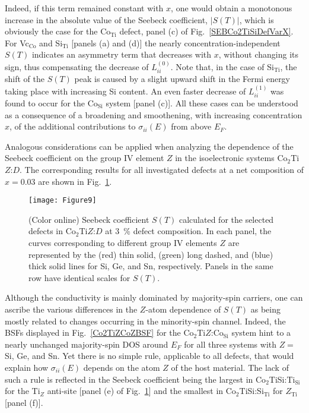 \documentclass[aps,prb,twocolumn,superscriptaddress,showpacs]{revtex4}
\newcommand{\FG}[1]{Fig.~\ref{#1}}
\begin{document}
Indeed, if this term remained constant with  $x$, one would obtain 
a monotonous increase in the absolute value of the Seebeck coefficient,
$|S(T)|$, which is obviously the case for the Co$_\text{Ti}$ defect, 
panel (c) of \FG{SEBCo2TiSiDefVarX}.
For Vc$_\text{Co}$ and Si$_\text{Ti}$ [panels (a) and (d)]
the nearly concentration-independent $S(T)$ indicates an 
asymmetry term that decreases with $x$, without changing
its sign, thus compensating the decrease of $L_{ii}^{(0)}$. 
Note that, in the case of Si$_\text{Ti}$, the shift of the 
$S(T)$ peak is caused by a slight upward shift in the Fermi 
energy taking place with increasing Si content.
An even faster decrease of $L_{ii}^{(1)}$ was found to occur
for the Co$_\text{Si}$ system [panel (c)]. All these
cases can be understood as a consequence of a
broadening and smoothening, with increasing concentration $x$,
of the additional contributions to $\sigma_{ii}(E)$
from above $E_F$.


Analogous considerations can be applied when analyzing the
dependence of the Seebeck coefficient on the group IV
element $Z$ in the isoelectronic systems Co$_2$Ti$Z$:$D$.
The corresponding results for all investigated defects
at a net composition of $x=0.03$ are shown in \FG{SEBCo2TiZDef}.

\begin{figure}
 \texttt{[image: Figure9]}
 \caption{(Color online) 
   Seebeck coefficient $S(T)$ calculated for
   the selected defects in Co$_2$Ti$Z$:$D$ at
   $3$~\% defect composition. In each panel,
   the curves corresponding to different group IV elements $Z$ are
   represented by the (red) thin solid, (green) long dashed, 
   and (blue) thick solid lines for Si, Ge, and Sn, respectively.
   Panels in the same row have identical scales for $S(T)$.}
 \label{SEBCo2TiZDef}
\end{figure}

Although the conductivity is mainly dominated by 
majority-spin carriers, one can ascribe the 
various differences in the $Z$-atom dependence of $S(T)$ 
as being mostly related to changes occurring in the 
minority-spin channel. Indeed, the BSFs displayed in
\FG{Co2TiZCoZBSF} for the Co$_2$Ti$Z$:Co$_\text{Si}$ system 
hint to a nearly unchanged majority-spin DOS around $E_F$ 
for all three systems with $Z=$ Si, Ge, and Sn. 
Yet there is no simple rule, applicable to all defects,
that would explain how $\sigma_{ii}(E)$ depends on the
atom $Z$ of the host material. The lack of such a rule
is reflected in the Seebeck coefficient being
the largest in Co$_2$TiSi:Ti$_\text{Si}$ for the Ti$_Z$ anti-site
[panel (e) of \FG{SEBCo2TiZDef}] and the smallest in 
Co$_2$TiSi:Si$_\text{Ti}$ for $Z_\text{Ti}$ [panel (f)].
\end{document}
